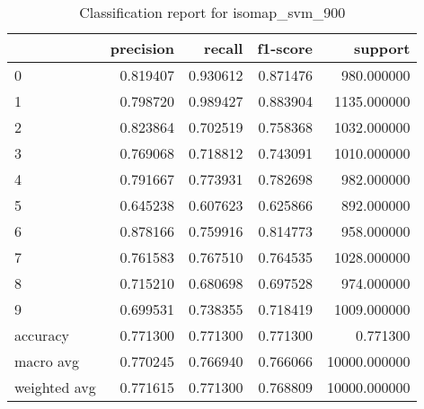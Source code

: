 \begin{table}[htb!]
\centering
\caption{Classification report for isomap_svm_900}
\label{tab:classification-report-isomap_svm_900}
\begin{tabular}{lrrrr}
\toprule
 & precision & recall & f1-score & support \\
\midrule
0 & 0.819407 & 0.930612 & 0.871476 & 980.000000 \\
1 & 0.798720 & 0.989427 & 0.883904 & 1135.000000 \\
2 & 0.823864 & 0.702519 & 0.758368 & 1032.000000 \\
3 & 0.769068 & 0.718812 & 0.743091 & 1010.000000 \\
4 & 0.791667 & 0.773931 & 0.782698 & 982.000000 \\
5 & 0.645238 & 0.607623 & 0.625866 & 892.000000 \\
6 & 0.878166 & 0.759916 & 0.814773 & 958.000000 \\
7 & 0.761583 & 0.767510 & 0.764535 & 1028.000000 \\
8 & 0.715210 & 0.680698 & 0.697528 & 974.000000 \\
9 & 0.699531 & 0.738355 & 0.718419 & 1009.000000 \\
accuracy & 0.771300 & 0.771300 & 0.771300 & 0.771300 \\
macro avg & 0.770245 & 0.766940 & 0.766066 & 10000.000000 \\
weighted avg & 0.771615 & 0.771300 & 0.768809 & 10000.000000 \\
\bottomrule
\end{tabular}
\end{table}
